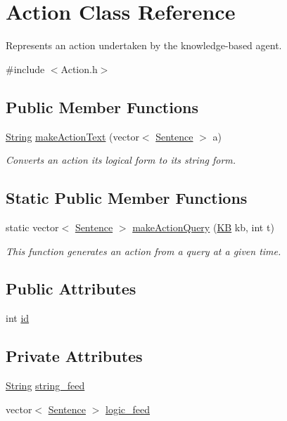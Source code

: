 \hypertarget{classAction}{}\section{Action Class Reference}
\label{classAction}


Represents an action undertaken by the knowledge-\/based agent.  




{\ttfamily \#include $<$Action.\+h$>$}

\subsection*{Public Member Functions}
\begin{DoxyCompactItemize}
\item 
\mbox{\hyperlink{classString}{String}} \mbox{\hyperlink{classAction_a6fc4f01bddc1431da13be9c4d93beece}{make\+Action\+Text}} (vector$<$ \mbox{\hyperlink{classSentence}{Sentence}} $>$ a)
\begin{DoxyCompactList}\small\item\em Converts an action its logical form to its string form. \end{DoxyCompactList}\end{DoxyCompactItemize}
\subsection*{Static Public Member Functions}
\begin{DoxyCompactItemize}
\item 
static vector$<$ \mbox{\hyperlink{classSentence}{Sentence}} $>$ \mbox{\hyperlink{classAction_ab7c26e0f05deddc0a8bf9c3cfd1da11c}{make\+Action\+Query}} (\mbox{\hyperlink{classKB}{KB}} kb, int t)
\begin{DoxyCompactList}\small\item\em This function generates an action from a query at a given time. \end{DoxyCompactList}\end{DoxyCompactItemize}
\subsection*{Public Attributes}
\begin{DoxyCompactItemize}
\item 
int \mbox{\hyperlink{classAction_ae2c2239aee4b28f7c90f3dfa7abc060a}{id}}
\end{DoxyCompactItemize}
\subsection*{Private Attributes}
\begin{DoxyCompactItemize}
\item 
\mbox{\hyperlink{classString}{String}} \mbox{\hyperlink{classAction_a22cc7c6c8cc34293f94713542eb7f353}{string\+\_\+feed}}
\item 
vector$<$ \mbox{\hyperlink{classSentence}{Sentence}} $>$ \mbox{\hyperlink{classAction_ab3623cf8b6271dec461907a3e68687e4}{logic\+\_\+feed}}
\end{DoxyCompactItemize}


